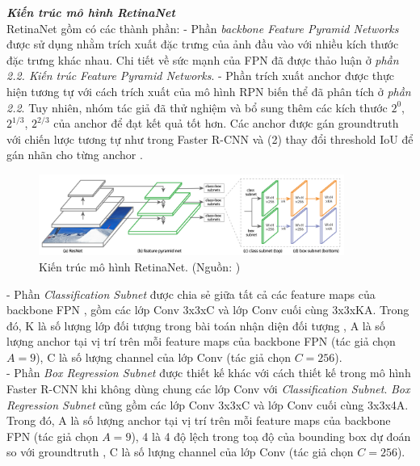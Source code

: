 {    \noindent
    \textbf{\textit{Kiến trúc mô hình RetinaNet}} \\
    RetinaNet  gồm có các thành phần:
    - Phần \textit{backbone Feature Pyramid Networks} được sử dụng nhằm trích xuất đặc trưng của ảnh đầu vào với nhiều kích thước đặc trưng khác nhau.
    Chi tiết về sức mạnh của FPN  đã được thảo luận ở \textit{phần 2.2. Kiến trúc Feature Pyramid Networks}.
    - Phần trích xuất anchor  được thực hiện tương tự với cách trích xuất của mô hình RPN biến thể đã phân tích ở \textit{phần 2.2}.
    Tuy nhiên, nhóm tác giả đã thử nghiệm và bổ sung thêm các kích thước $2^{0}$, $2^{1/3}$, $2^{2/3}$ của anchor  để đạt kết quả tốt hơn.
    Các anchor  được gán groundtruth  với chiến lược tương tự như trong Faster R-CNN  \cite{ren2015faster} và (2) thay đổi threshold IoU  để gán nhãn cho từng anchor .

    \begin{figure}[H]
        \centering
        \includegraphics[width=10cm] {images/retinanet_model}
        \caption{Kiến trúc mô hình RetinaNet. (Nguồn: \cite{lin2017focal})}
        \label{fig:retinanet_model}
    \end{figure}

    \noindent
    - Phần \textit{Classification Subnet} được chia sẻ giữa tất cả các feature maps  của backbone FPN , gồm các lớp Conv  3x3xC và lớp Conv  cuối cùng 3x3xKA.
    Trong đó, K là số lượng lớp đối tượng  trong bài toán nhận diện đối tượng , A là số lượng anchor  tại vị trí trên mỗi feature maps  của backbone FPN  (tác giả chọn $A = 9$), C là số lượng channel  của lớp Conv  (tác giả chọn $C = 256$). \\
    - Phần \textit{Box Regression Subnet} được thiết kế khác với cách thiết kế trong mô hình Faster R-CNN  \cite{ren2015faster} khi không dùng chung các lớp Conv  với \textit{Classification Subnet}.
    \textit{Box Regression Subnet} cũng gồm các lớp Conv  3x3xC và lớp Conv  cuối cùng 3x3x4A.
    Trong đó, A là số lượng anchor  tại vị trí trên mỗi feature maps của backbone FPN  (tác giả chọn $A = 9$), 4 là 4 độ lệch trong toạ độ của bounding box  dự đoán so với groundtruth , C là số lượng channel  của lớp Conv  (tác giả chọn $C = 256$).

}
